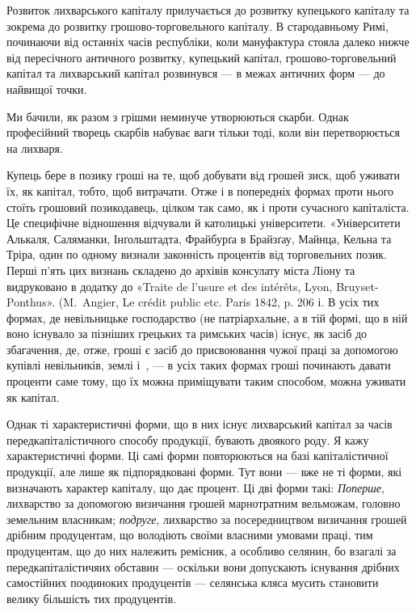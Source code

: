 
Розвиток лихварського капіталу прилучається до розвитку купецького капіталу
та зокрема до розвитку грошово-торговельного капіталу. В стародавньому
Римі, починаючи від останніх часів республіки, коли мануфактура стояла далеко
нижче від пересічного античного розвитку, купецький капітал, грошово-торговельний
капітал та лихварський капітал розвинувся — в межах античних форм —
до найвищої точки.

Ми бачили, як разом з грішми неминуче утворюються скарби. Однак професійний
творець скарбів набуває ваги тільки тоді, коли він перетворюється на
лихваря.

Купець бере в позику гроші на те, щоб добувати від грошей зиск, щоб уживати
їх, як капітал, тобто, щоб витрачати. Отже і в попередніх формах проти
нього стоїть грошовий позикодавець, цілком так само, як і проти сучасного капіталіста.
Це специфічне відношення відчували й католицькі університети. «Університети
Алькаля, Саляманки, Інґольштадта, Фрайбурґа в Брайзґау, Майнца, Кельна та
Тріра, один по одному визнали законність процентів від торговельних позик.
Перші п’ять цих визнань складено до архівів консулату міста Ліону та видруковано
в додатку до «Traite de l’usure et des intérêts, Lyon, Bruyset-Ponthus».
(M.~Angier, Le crédit public etc. Paris 1842, p. 206 і. В усіх тих формах, де невільницьке
господарство (не патріархальне, а в тій формі, що в ній воно існувало
за пізніших грецьких та римських часів) існує, як засіб до збагачення,
де, отже, гроші є засіб до присвоювання чужої праці за допомогою купівлі невільників,
землі і~, — в усіх таких формах гроші починають давати проценти
саме тому, що їх можна приміщувати таким способом, можна уживати
як капітал.

Однак ті характеристичні форми, що в них існує лихварський капітал за
часів передкапіталістичного способу продукції, бувають двоякого роду. Я кажу
характеристичні форми. Ці самі форми повторюються на базі капіталістичної
продукції, але лише як підпорядковані форми. Тут вони — вже не ті форми, які
визначають характер капіталу, що дає процент. Ці дві форми такі: \emph{Поперше},
лихварство за допомогою визичання грошей марнотратним вельможам, головно
земельним власникам; \emph{подруге}, лихварство за посередництвом визичання грошей
дрібним продуцентам, що володіють своїми власними умовами праці, тим продуцентам,
що до них належить ремісник, а особливо селянин, бо взагалі за передкапіталістичяих
обставин — оскільки вони допускають існування дрібних самостійних
поодиноких продуцентів — селянська кляса мусить становити велику більшість
тих продуцентів.

